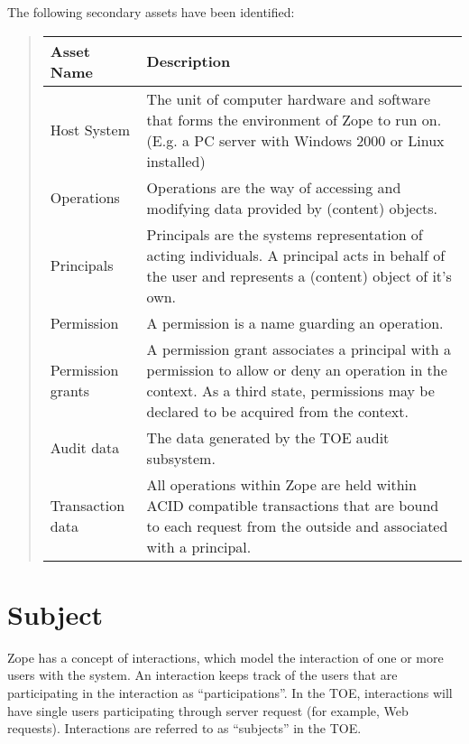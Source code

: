 \documentclass[10pt,a4paper,english]{book}
\newlength{\locallinewidth}
\begin{document}
The following secondary assets have been identified:
\begin{quote}

\begin{longtable}[c]{|p{0.21\locallinewidth}|p{0.67\locallinewidth}|}
\hline
\textbf{
Asset Name
} & \textbf{
Description
} \\
\hline
\endhead

Host System
 & 
The unit of computer hardware and software that
forms the environment of Zope to run on. (E.g.
a PC server with Windows 2000 or Linux installed)
 \\
\hline

Operations
 & 
Operations are the way of accessing and modifying
data provided by (content) objects.
 \\
\hline

Principals
 & 
Principals are the systems representation of acting
individuals. A principal acts in behalf of the user
and represents a (content) object of it's own.
 \\
\hline

Permission
 & 
A permission is a name guarding an operation.
 \\
\hline

Permission grants
 & 
A permission grant associates a principal with a
permission to allow or deny an operation in the context.
As a third state, permissions may be declared to
be acquired from the context.
 \\
\hline

Audit data
 & 
The data generated by the TOE audit subsystem.
 \\
\hline

Transaction data
 & 
All operations within Zope are held within ACID
compatible transactions that are bound to each
request from the outside and associated with a
principal.
 \\
\hline
\end{longtable}
\end{quote}



\hypertarget{subject}{}
\section{Subject}

Zope has a concept of interactions, which model the interaction of one
or more users with the system.  An interaction keeps track of the
users that are participating in the interaction as ``participations''.
In the TOE, interactions will have single users participating through
server request (for example, Web requests).  Interactions are referred
to as ``subjects'' in the TOE.
\end{document}
